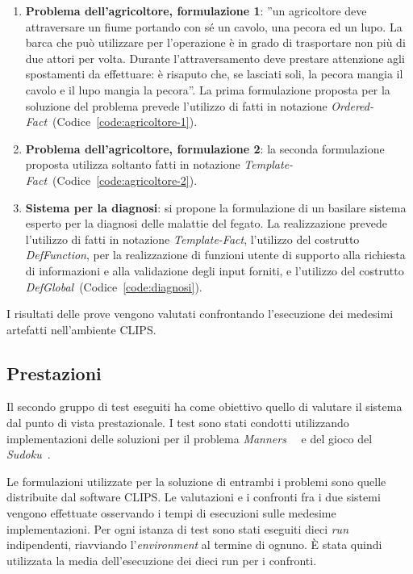 \begin{enumerate}
	\item \textbf{Problema dell'agricoltore, formulazione 1}: ''un agricoltore deve attraversare un fiume portando con sé un cavolo, una pecora ed un lupo. La barca che può utilizzare per l'operazione è in grado di trasportare non più di due attori per volta. Durante l'attraversamento deve prestare attenzione agli spostamenti da effettuare: è risaputo che, se lasciati soli, la pecora mangia il cavolo e il lupo mangia la pecora''. La prima formulazione proposta per la soluzione del problema prevede l'utilizzo di fatti in notazione \emph{Ordered-Fact}~(Codice~\ref{code:agricoltore-1}).
	
	\item \textbf{Problema dell'agricoltore, formulazione 2}: la seconda formulazione proposta utilizza soltanto fatti in notazione \emph{Template-Fact}~(Codice~\ref{code:agricoltore-2}).

	\item \textbf{Sistema per la diagnosi}: si propone la formulazione di un basilare sistema esperto per la diagnosi delle malattie del fegato. La realizzazione prevede l'utilizzo di fatti in notazione \emph{Template-Fact}, l'utilizzo del costrutto \emph{DefFunction}, per la realizzazione di funzioni utente di supporto alla richiesta di informazioni e alla validazione degli input forniti, e l'utilizzo del costrutto \emph{DefGlobal}~(Codice~\ref{code:diagnosi}).

\end{enumerate}

I risultati delle prove vengono valutati confrontando l'esecuzione dei medesimi artefatti nell'ambiente CLIPS.

\subsection{Prestazioni}

Il secondo gruppo di test eseguiti ha come obiettivo quello di valutare il sistema dal punto di vista prestazionale. I test sono stati condotti utilizzando implementazioni delle soluzioni per il problema \emph{Manners}~\cite{brantetal91}~\cite{ops5bench} e del gioco del \emph{Sudoku}~\cite{clipssudoku}.

Le formulazioni utilizzate per la soluzione di entrambi i problemi sono quelle distribuite dal software CLIPS. Le valutazioni e i confronti fra i due sistemi vengono effettuate osservando i tempi di esecuzioni sulle medesime implementazioni. Per ogni istanza di test sono stati eseguiti dieci \emph{run} indipendenti, riavviando l'\emph{environment} al termine di ognuno. \`E stata quindi utilizzata la media dell'esecuzione dei dieci run per i confronti.


